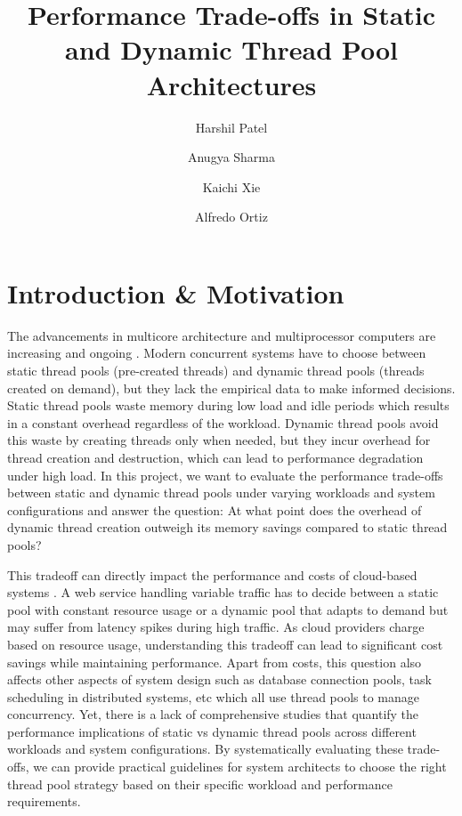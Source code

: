 \documentclass[sigconf, 10pt]{acmart}
\begin{document}
\title{Performance Trade-offs in Static and Dynamic Thread Pool Architectures}

\author{Harshil Patel}

\author{Anugya Sharma}

\author{Kaichi Xie}
\author{Alfredo Ortiz}
\authorsaddresses{}

\maketitle
\section{Introduction \& Motivation}
The advancements in multicore architecture and multiprocessor computers are increasing and ongoing \cite{adam2022co}.
Modern concurrent systems have to choose between static thread pools (pre-created threads) and dynamic thread pools (threads created on demand), but they lack the empirical data to make informed decisions.
Static thread pools waste memory during low load and idle periods which results in a constant overhead regardless of the workload.
Dynamic thread pools avoid this waste by creating threads only when needed, but they incur overhead for thread creation and destruction, which can lead to performance degradation under high load.
In this project, we want to evaluate the performance trade-offs between static and dynamic thread pools under varying workloads and system configurations and answer the question: At what point does the overhead of dynamic thread creation outweigh its memory savings compared to static thread pools?

This tradeoff can directly impact the performance and costs of cloud-based systems \cite{freire2021performance}.
A web service handling variable traffic has to decide between a static pool with constant resource usage or a dynamic pool that adapts to demand but may suffer from latency spikes during high traffic.
As cloud providers charge based on resource usage, understanding this tradeoff can lead to significant cost savings while maintaining performance.
Apart from costs, this question also affects other aspects of system design such as database connection pools, task scheduling in distributed systems, etc which all use thread pools to manage concurrency.
Yet, there is a lack of comprehensive studies that quantify the performance implications of static vs dynamic thread pools across different workloads and system configurations.
By systematically evaluating these trade-offs, we can provide practical guidelines for system architects to choose the right thread pool strategy based on their specific workload and performance requirements.
\end{document}
